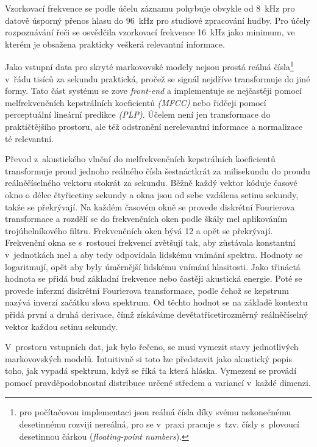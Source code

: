 Vzorkovací frekvence se podle účelu záznamu pohybuje obvykle od 8~kHz pro
datově úsporný přenos hlasu do 96~kHz pro studiové zpracování hudby. Pro účely
rozpoznávání řeči se osvědčila vzorkovací frekvence 16~kHz jako minimum, ve
kterém je obsažena prakticky veškerá relevantní informace.

Jako vstupní data pro skryté markovovské modely nejsou prostá reálná
čísla\footnote{pro počítačovou implementaci jsou reálná čísla díky svému
nekonečnému desetinnému rozviji nereálná, pro se v~praxi pracuje s~tzv. čísly
s~plovoucí desetinnou čárkou (\textit{floating-point numbers}).} v~řádu tisíců
za sekundu praktická, pročež se signál nejdříve transformuje do jiné formy. Tato
část systému se zove \textit{front-end} a implementuje se nejčastěji pomocí
melfrekvenčních kepstrálních koeficientů \textit{(MFCC)} nebo řidčeji pomocí
perceptuální lineární predikce \textit{(PLP)}. Účelem není jen transformace do
praktičtějšího prostoru, ale též odstranění nerelevantní informace a normalizace
té relevantní.

Převod z~akustického vlnění do melfrekvenčních kepstrálních koeficientů
transformuje proud jednoho reálného čísla šestnáctkrát za milisekundu do proudu
reálněčíselného vektoru stokrát za sekundu. Běžně každý vektor kóduje časové
okno o délce čtyřicetiny sekundy a okna jsou od sebe vzdálena setinu sekundy,
takže se překrývají. Na každém časovém okně se provede diskrétní Fourierova
transformace a rozdělí se do frekvenčních oken podle škály
mel\cite{stevens1937scale} aplikováním trojúhelníkového filtru. Frekvenčních
oken bývá 12 a opět se překrývají. Frekvenční okna se s~rostoucí frekvencí
zvětšují tak, aby zůstávala konstantní v~jednotkách mel a aby tedy odpovídala
lidskému vnímání spektra. Hodnoty se logaritmují, opět aby byly
úměrnější lidskému vnímání hlasitosti. Jako třináctá hodnota se přidá buď
základní frekvence nebo častěji akustická energie. Poté se provede inferzní
diskrétní Fourierova transformace, podle čehož se kepstrum nazývá inverzí
začátku slova spektrum. Od těchto hodnot se na základě kontextu přidá první a
druhá derivace, čímž získáváme devětatřicetirozměrný reálněčíselný vektor každou
setinu sekundy.


V~prostoru vstupních dat, jak bylo řečeno, se musí vymezit stavy jednotlivých
markovovských modelů. Intuitivně si toto lze představit jako akustický popis
toho, jak vypadá spektrum, když se říká ta která hláska. Vymezení se provádí
pomocí pravděpodobnostní distribuce určené středem a variancí v~každé dimenzi.

